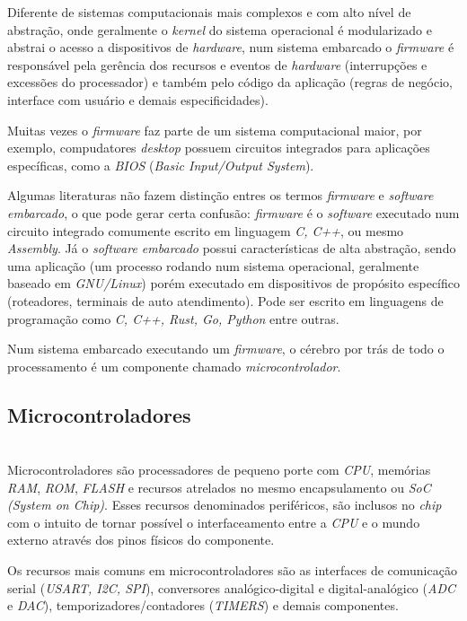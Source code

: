 \documentclass[times, twoside, watermark]{artigo}
\begin{document}
Diferente de sistemas computacionais mais complexos e com alto nível de abstração,
onde geralmente o \textit{kernel} do sistema operacional é modularizado e abstrai
o acesso a dispositivos de \textit{hardware},
num sistema embarcado o \textit{firmware} é responsável pela gerência dos recursos 
e eventos de \textit{hardware} (interrupções e excessões do processador) e também
pelo código da aplicação (regras de negócio, interface com usuário e demais especificidades).

Muitas vezes o \textit{firmware} faz parte de um sistema computacional maior,
por exemplo, compudatores \textit{desktop} possuem circuitos integrados para 
aplicações específicas, como a \textit{BIOS} (\textit{Basic Input/Output System}).

Algumas literaturas não fazem distinção entres os termos \textit{firmware} e 
\textit{software embarcado}, o que pode gerar certa confusão: \textit{firmware}
é o \textit{software} executado num circuito integrado comumente escrito em 
linguagem \textit{C, C++}, ou mesmo \textit{Assembly}. Já o \textit{software embarcado} 
possui características de alta abstração, sendo uma aplicação (um processo rodando 
num sistema operacional, geralmente baseado em \textit{GNU/Linux}) porém executado 
em dispositivos de propósito específico (roteadores, terminais de auto atendimento). 
Pode ser escrito em linguagens de programação como \textit{C, C++, Rust, Go, Python} entre outras.

Num sistema embarcado executando um \textit{firmware}, o cérebro por trás de todo o processamento é um componente chamado \textit{microcontrolador}.


\subsection{Microcontroladores}\hfill\\
Microcontroladores são processadores de pequeno porte com \textit{CPU}, memórias \textit{RAM}, \textit{ROM},
\textit{FLASH} e recursos atrelados no mesmo encapsulamento ou \textit{SoC (System on Chip)}.
Esses recursos denominados periféricos, são inclusos no \textit{chip} com o intuito de
tornar possível o interfaceamento entre a \textit{CPU} e o mundo externo através dos 
pinos físicos do componente.

Os recursos mais comuns em microcontroladores são as interfaces de comunicação 
serial (\textit{USART, I2C, SPI}), conversores analógico-digital e digital-analógico 
(\textit{ADC} e \textit{DAC}), temporizadores/contadores (\textit{TIMERS}) e demais componentes.
\end{document}
